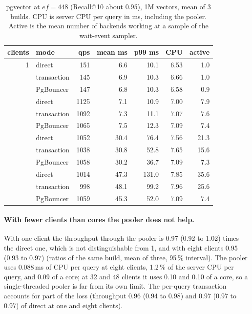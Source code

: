 \documentclass[sigconf, nonacm]{acmart}
\begin{document}
\begin{table}[t]
  \caption{pgvector at $ef=448$ (Recall@10 about 0.95), 1M vectors, mean of 3 builds. CPU is server CPU per query in ms,
  including the pooler. Active is the mean number of backends working at a sample of the wait-event sampler.}
  \label{tab:pooling}
  \small
  \begin{tabular}{@{}rlrrrrr@{}}
    \toprule
    clients & mode & qps & mean ms & p99 ms & CPU & active \\
    \midrule
    1 & direct & 151 & 6.6 & 10.1 & 6.53 & 1.0 \\
     & transaction & 145 & 6.9 & 10.3 & 6.66 & 1.0 \\
     & PgBouncer & 147 & 6.8 & 10.3 & 6.58 & 0.9 \\
    \addlinespace
    8 & direct & 1125 & 7.1 & 10.9 & 7.00 & 7.9 \\
     & transaction & 1092 & 7.3 & 11.1 & 7.07 & 7.6 \\
     & PgBouncer & 1065 & 7.5 & 12.3 & 7.09 & 7.4 \\
    \addlinespace
    32 & direct & 1052 & 30.4 & 76.4 & 7.56 & 21.3 \\
     & transaction & 1038 & 30.8 & 52.8 & 7.65 & 15.6 \\
     & PgBouncer & 1058 & 30.2 & 36.7 & 7.09 & 7.3 \\
    \addlinespace
    48 & direct & 1014 & 47.3 & 131.0 & 7.85 & 35.6 \\
     & transaction & 998 & 48.1 & 99.2 & 7.96 & 25.6 \\
     & PgBouncer & 1059 & 45.3 & 52.0 & 7.09 & 7.4 \\
    \bottomrule
  \end{tabular}
\end{table}

\paragraph{With fewer clients than cores the pooler does not help.} With one client the throughput through the pooler is 0.97 (0.92 to 1.02)
times the direct one, which is not distinguishable from 1, and with eight clients 0.95 (0.93 to 0.97) (ratios of the same build, mean of three, 95\,\% interval). The pooler
uses 0.088\,ms of CPU per query at eight clients, 1.2\,\% of the server CPU per query, and 0.09 of a core; at 32 and 48
clients it uses 0.10 and 0.10 of a core, so a single-threaded pooler is far from its own limit. The per-query
transaction accounts for part of the loss (throughput 0.96 (0.94 to 0.98) and 0.97 (0.97 to 0.97) of direct at one and eight clients).
\end{document}
